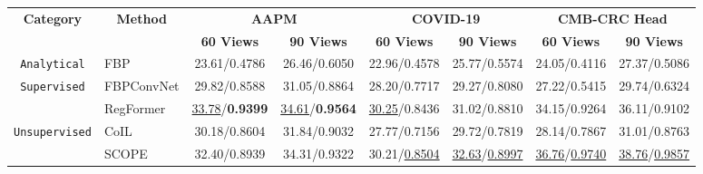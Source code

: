 

\begin{table*}[!h]
\setlength{\tabcolsep}{1.3mm}
\centering

\begin{tabular}{clcccccc} 
\toprule
\multirow{2.5}{*}{\textbf{Category}} & \multicolumn{1}{c}{\multirow{2.5}{*}{\textbf{Method}}} & \multicolumn{2}{c}{\textbf{AAPM}}                             & \multicolumn{2}{c}{\textbf{COVID-19}}                           & \multicolumn{2}{c}{\textbf{CMB-CRC Head}}                        \\ 
\cmidrule(lr){3-4}\cmidrule(lr){5-6}\cmidrule(lr){7-8}
                              & \multicolumn{1}{c}{}                & \textbf{60 Views}             & \textbf{90 Views}             & \textbf{60 Views}              & \textbf{90 Views}              & \textbf{\textbf{60 Views}} & \textbf{\textbf{90 Views}}  \\ 
\midrule
\texttt{Analytical}                    & FBP                                 & 23.61/0.4786                  & 26.46/0.6050                  & 22.96/0.4578                   & 25.77/0.5574                   & 24.05/0.4116               & 27.37/0.5086                \\ 
\cmidrule(l){1-5}\cmidrule{6-8}
\multirow{2}{*}{\texttt{Supervised}}   & FBPConvNet                          & 29.82/0.8588                  & 31.05/0.8864                  & 28.20/0.7717                   & 29.27/0.8080                   & 27.22/0.5415               & 29.74/0.6324                \\
                              & RegFormer                           & \underline{33.78}/\textbf{0.9399} & \underline{34.61}/\textbf{0.9564} & \underline{30.25}/0.8436           & 31.02/0.8810                   & 34.15/0.9264               & 36.11/0.9102                \\ 
\cmidrule(l){1-5}\cmidrule{6-8}
\multirow{3}{*}{\texttt{Unsupervised}} & CoIL                                & 30.18/0.8604                  & 31.84/0.9032                  & 27.77/0.7156                   & 29.72/0.7819                   &      28.14/0.7867                  & 31.01/0.8763                           \\
                              & SCOPE                               & 32.40/0.8939                  & 34.31/0.9322                  & 30.21/\underline{0.8504}           & \underline{32.63}/\underline{0.8997}   & \underline{36.76}/\underline{0.9740}               & \underline{38.76}/\underline{0.9857}                \\

\end{tabular}
\end{table*}

